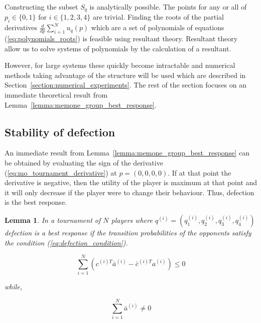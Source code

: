 \documentclass[10pt]{article}
\newtheorem{lemma}[theorem]{Lemma}
\begin{document}
Constructing the subset \(S_q\) is analytically possible. The points for any or
all of \(p_i \in \{0, 1\}\) for \(i \in \{1, 2, 3, 4\}\) are trivial. Finding the
roots of the partial derivatives \(\frac{d}{dp} \sum\limits_{i=1} ^ N  u_q(p)\)
which are a set of polynomials of equations (\ref{eq:polynomials_roots})
is feasible using resultant theory. Resultant theory~\cite{Jonsson2005} allow us
to solve systems of polynomials by the calculation of a resultant.

However, for large systems these quickly become intractable and numerical methods
taking advantage of the structure will be used which are described in
Section~\ref{section:numerical_experiments}. The rest of the section focuses
on an immediate theoretical result from Lemma~\ref{lemma:memone_group_best_response}.

\subsection{Stability of defection}\label{subsection:stability_of_defection}

An immediate result from Lemma~\ref{lemma:memone_group_best_response} can be
obtained by evaluating the sign of the derivative
(\ref{eq:mo_tournament_derivative}) at \(p=(0, 0, 0, 0)\). If at that point the
derivative is negative, then the utility of the player is maximum at that point
and it will only decrease if the player were to change their behaviour. Thus,
defection is the best response.

\begin{lemma}\label{lemma:stability_of_defection}
    In a tournament of \(N\) players where \(q^{(i)} = (q_{1}^{(i)}, q_{2}^{(i)}, q_{3}^{(i)}, q_{4}^{(i)})\)
    defection is a best response if the transition probabilities of the
    opponents satisfy the condition (\ref{eq:defection_condition}).

    \begin{equation}\label{eq:defection_condition}
        \sum_{i=1} ^ N (c^{(i)T} \bar{a}^{(i)} - \bar{c}^{(i)T} a^{(i)}) \leq 0
    \end{equation}

    while,

    \begin{equation}\label{eq:defection_condition}
        \sum_{i=1} ^ N \bar{a}^{(i)} \neq 0
    \end{equation}
\end{lemma}
\end{document}
